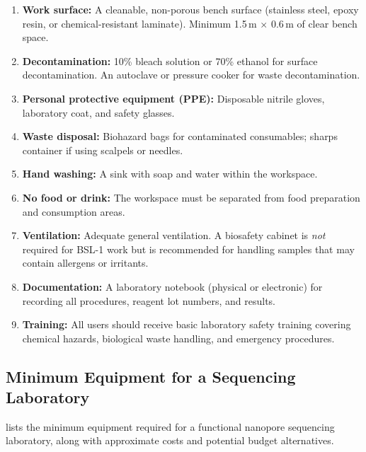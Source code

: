 \begin{protocolbox}[title={Minimum Requirements for a BSL-1 Sequencing Workspace}]
\begin{enumerate}[itemsep=2pt]
  \item \textbf{Work surface:} A cleanable, non-porous bench surface (stainless steel, epoxy resin, or chemical-resistant laminate). Minimum 1.5\,m $\times$ 0.6\,m of clear bench space.
  \item \textbf{Decontamination:} 10\% bleach solution or 70\% ethanol for surface decontamination. An autoclave or pressure cooker for waste decontamination.
  \item \textbf{Personal protective equipment (PPE):} Disposable nitrile gloves, laboratory coat, and safety glasses.
  \item \textbf{Waste disposal:} Biohazard bags for contaminated consumables; sharps container if using scalpels or needles.
  \item \textbf{Hand washing:} A sink with soap and water within the workspace.
  \item \textbf{No food or drink:} The workspace must be separated from food preparation and consumption areas.
  \item \textbf{Ventilation:} Adequate general ventilation. A biosafety cabinet is \emph{not} required for BSL-1 work but is recommended for handling samples that may contain allergens or irritants.
  \item \textbf{Documentation:} A laboratory notebook (physical or electronic) for recording all procedures, reagent lot numbers, and results.
  \item \textbf{Training:} All users should receive basic laboratory safety training covering chemical hazards, biological waste handling, and emergency procedures.
\end{enumerate}
\end{protocolbox}

\subsection{Minimum Equipment for a Sequencing Laboratory}
\label{subsec:accessible:equipment}

 lists the minimum equipment required for a functional nanopore sequencing laboratory, along with approximate costs and potential budget alternatives.

